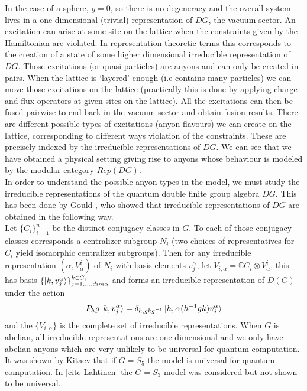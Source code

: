 \documentclass{article}
\begin{document}
In the case of a sphere, $g=0$, so there is no degeneracy and the overall system lives in a one dimensional (trivial) representation of $DG$, the vacuum sector. An excitation can arise at some site on the lattice when the constraints given by the Hamiltonian are violated. In representation theoretic terms this corresponds to the creation of a state of some higher dimensional irreducible representation of $DG$. Those excitations (or quasi-particles) are anyons and can only be created in pairs. When the lattice is `layered' enough (i.e contains many particles) we can move those excitations on the lattice (practically this is done by applying charge and flux operators at given sites on the lattice). All the excitations can then be fused pairwise to end back in the vacuum sector and obtain fusion results. There are different possible types of excitations (anyon flavours) we can create on the lattice, corresponding to different ways violation of the constraints. These are precisely indexed by the irreducible representations of $DG$. We can see that we have obtained a physical setting giving rise to anyons whose behaviour is modeled by the modular category $Rep(DG)$.\\
In order to understand the possible anyon types in the model, we must study the irreducible representations of the quantum double finite group algebra $DG$. This has been done by Gould \cite{Gould93}, who showed that irreducible representations of $DG$ are obtained in the following way.\\
Let $\{C_i\}_{i=1}^n$ be the distinct conjugacy classes in $G$. To each of those conjugacy classes corresponds a centralizer subgroup $N_i$ (two choices of representatives for $C_i$ yield isomorphic centralizer subgroups). Then for any irreducible representation $(\alpha,V^i_\alpha)$ of $N_i$ with basis elements $v^\alpha_j$, let $V_{i,\alpha} = \mathbb{C}C_i \otimes V^i_\alpha$, this has basis $\{ \ket{k,v^\alpha_j} \}_{j=1,...,dim\alpha}^{k\in C_i}$ and forms an irreducible representation of $D(G)$ under the action 
\begin{equation}
P_hg\ket{k,v^\alpha_j} = \delta_{h,gkg^{-1}} \ket{h,\alpha(h^{-1}gk)v^\alpha_j}
\end{equation}
and the $\{V_{i,\alpha}\}$ is the complete set of irreducible representations. When $G$ is abelian, all irreducible representations are one-dimensional and we only have abelian anyons which are very unlikely to be universal for quantum computation. It was shown by Kitaev that if $G=S_5$ the model is universal for quantum computation. In [cite Lahtinen] the $G=S_3$ model was considered but not shown to be universal.
\end{document}

